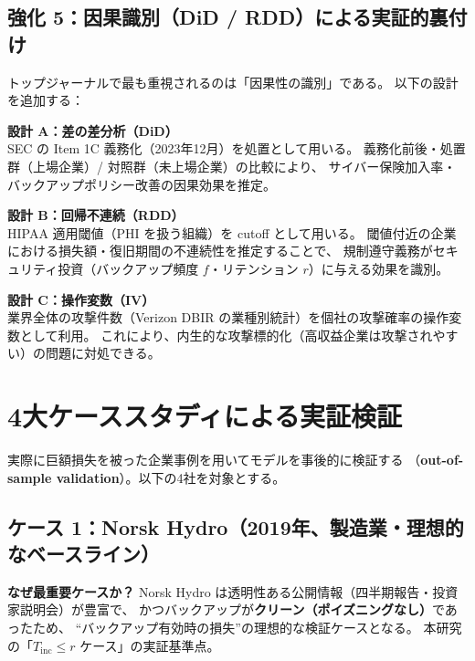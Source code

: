 \documentclass[a4paper,11pt]{article}
\theoremstyle{definition}
\begin{document}
\subsection{強化 5：因果識別（DiD / RDD）による実証的裏付け}

トップジャーナルで最も重視されるのは「因果性の識別」である。
以下の設計を追加する：

\begin{tcolorbox}[strategybox, title={準実験的識別戦略}]
  \textbf{設計 A：差の差分析（DiD）}\\
  SEC の Item 1C 義務化（2023年12月）を処置として用いる。
  義務化前後・処置群（上場企業）/ 対照群（未上場企業）の比較により、
  サイバー保険加入率・バックアップポリシー改善の因果効果を推定。

  \vspace{6pt}
  \textbf{設計 B：回帰不連続（RDD）}\\
  HIPAA 適用閾値（PHI を扱う組織）を cutoff として用いる。
  閾値付近の企業における損失額・復旧期間の不連続性を推定することで、
  規制遵守義務がセキュリティ投資（バックアップ頻度 $f$・リテンション $r$）に与える効果を識別。

  \vspace{6pt}
  \textbf{設計 C：操作変数（IV）}\\
  業界全体の攻撃件数（Verizon DBIR の業種別統計）を個社の攻撃確率の操作変数として利用。
  これにより、内生的な攻撃標的化（高収益企業は攻撃されやすい）の問題に対処できる。
\end{tcolorbox}

\section{4大ケーススタディによる実証検証}
\label{sec:case_studies}

実際に巨額損失を被った企業事例を用いてモデルを事後的に検証する
（\textbf{out-of-sample validation}）。以下の4社を対象とする。

\subsection{ケース 1：Norsk Hydro（2019年、製造業・理想的なベースライン）}

\begin{tcolorbox}[notebox]
  \textbf{なぜ最重要ケースか？}
  Norsk Hydro は透明性ある公開情報（四半期報告・投資家説明会）が豊富で、
  かつバックアップが\textbf{クリーン（ポイズニングなし）}であったため、
  ``バックアップ有効時の損失''の理想的な検証ケースとなる。
  本研究の「$T_{\mathrm{inc}} \leq r$ ケース」の実証基準点。
\end{tcolorbox}
\end{document}
